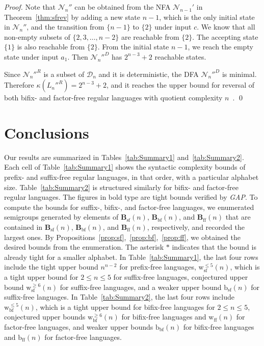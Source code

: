 \documentclass{llncs}
\renewcommand{\le}{\leqslant}
\renewcommand{\ge}{\geqslant}
\newcommand{\cD}{{\mathcal D}}
\newcommand{\cN}{{\mathcal N}}
\newcommand{\Bsf}{\mathbf{B}_{\mathrm{sf}}}
\newcommand{\Bbf}{\mathbf{B}_{\mathrm{bf}}}
\newcommand{\Bff}{\mathbf{B}_{\mathrm{ff}}}
\newcommand{\bsf}{{\mathrm{b}_{\mathrm{sf}}}}
\newcommand{\bbf}{{\mathrm{b}_{\mathrm{bf}}}}
\newcommand{\bff}{{\mathrm{b}_{\mathrm{ff}}}}
\newcommand{\vsf}{{\mathrm{w}^{\le 5}_{\mathrm{sf}}}}
\newcommand{\wsf}{{\mathrm{w}^{\ge 6}_{\mathrm{sf}}}}
\newcommand{\vbf}{{\mathrm{w}^{\le 5}_{\mathrm{bf}}}}
\newcommand{\wbf}{{\mathrm{w}^{\ge 6}_{\mathrm{bf}}}}
\newcommand{\wff}{{\mathrm{w}_{\mathrm{ff}}}}
\begin{document}
\begin{proof}
Note that $\cN_n''$ can be obtained from the NFA $\cN_{n-1}'$ in Theorem~\ref{thm:sfrev} by adding a new state $n-1$, which is the only initial state in $\cN_n''$, and the transition from $\{n-1\}$ to $\{2\}$ under input $c$. We know that all non-empty subsets of $\{2,3,\ldots,n-2\}$ are reachable from $\{2\}$. The accepting state $\{1\}$ is also reachable from $\{2\}$. From the initial state $n-1$, we reach the empty state under input $a_1$. Then $\cN_n''^D$ has $2^{n-3}+2$ reachable states. 

Since $\cN_n''^R$ is a subset of $\cD_n$ and it is deterministic, the DFA $\cN_n''^D$ is minimal. Therefore $\kappa(L_n''^R) = 2^{n-3}+2$, and it reaches the upper bound for reversal of both bifix- and factor-free regular languages with quotient complexity $n$~\cite{BJLS11}. \qed
\end{proof}

\section{Conclusions}\label{sec:cl}

Our results are summarized in Tables~\ref{tab:Summary1} and~\ref{tab:Summary2}. Each cell of Table~\ref{tab:Summary1} shows the syntactic complexity bounds of prefix- and suffix-free regular languages, in that order, with a particular alphabet size. Table~\ref{tab:Summary2} is structured similarly for bifix- and factor-free regular languages. The figures in bold type are tight bounds verified by {\it GAP}. To compute the bounds for suffix-, bifix-, and factor-free languages, we enumerated semigroups generated by elements of $\Bsf(n)$, $\Bbf(n)$, and $\Bff(n)$ that are contained in $\Bsf(n)$, $\Bbf(n)$, and $\Bff(n)$, respectively, and recorded the largest ones. By Propositions~\ref{prop:sf},~\ref{prop:bf},~\ref{prop:ff}, we obtained the desired bounds from the enumeration. The asterisk $\ast$ indicates that the bound is already tight for a smaller alphabet. In Table~\ref{tab:Summary1}, the last four rows include the tight upper bound $n^{n-2}$ for prefix-free languages, $\vsf(n)$, which is a tight upper bound for $2 \le n \le 5$ for suffix-free languages, conjectured upper bound $\wsf(n)$ for suffix-free languages, and a weaker upper bound $\bsf(n)$ for suffix-free languages. In Table~\ref{tab:Summary2}, the last four rows include $\vbf(n)$, which is a tight upper bound for bifix-free languages for $2 \le n \le 5$, conjectured upper bounds $\wbf(n)$ for bifix-free languages and $\wff(n)$ for factor-free languages, and weaker upper bounds $\bbf(n)$ for bifix-free languages and $\bff(n)$ for factor-free languages. 
\vspace{-.4cm}
\end{document}
